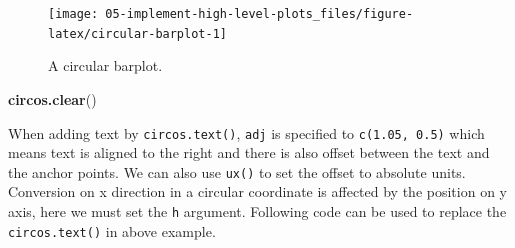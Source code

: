 \documentclass[]{book}
\newenvironment{Shaded}{\begin{snugshade}}{\end{snugshade}}
\newcommand{\KeywordTok}[1]{\textcolor[rgb]{0.13,0.29,0.53}{\textbf{#1}}}
\newcommand{\DataTypeTok}[1]{\textcolor[rgb]{0.13,0.29,0.53}{#1}}
\newcommand{\DecValTok}[1]{\textcolor[rgb]{0.00,0.00,0.81}{#1}}
\newcommand{\FloatTok}[1]{\textcolor[rgb]{0.00,0.00,0.81}{#1}}
\newcommand{\StringTok}[1]{\textcolor[rgb]{0.31,0.60,0.02}{#1}}
\newcommand{\OperatorTok}[1]{\textcolor[rgb]{0.81,0.36,0.00}{\textbf{#1}}}
\newcommand{\NormalTok}[1]{#1}
\begin{document}
\begin{Shaded}
\end{Shaded}

\begin{figure}

{\centering \texttt{[image: 05-implement-high-level-plots\_files/figure-latex/circular-barplot-1]} 

}

\caption{A circular barplot.}\label{fig:circular-barplot}
\end{figure}

\begin{Shaded}
\begin{Highlighting}[]
\KeywordTok{circos.clear}\NormalTok{()}
\end{Highlighting}
\end{Shaded}

When adding text by \texttt{circos.text()}, \texttt{adj} is specified to
\texttt{c(1.05,\ 0.5)} which means text is aligned to the right and
there is also offset between the text and the anchor points. We can also
use \texttt{ux()} to set the offset to absolute units. Conversion on x
direction in a circular coordinate is affected by the position on y
axis, here we must set the \texttt{h} argument. Following code can be
used to replace the \texttt{circos.text()} in above example.

\begin{Shaded}
\end{Shaded}
\end{document}
